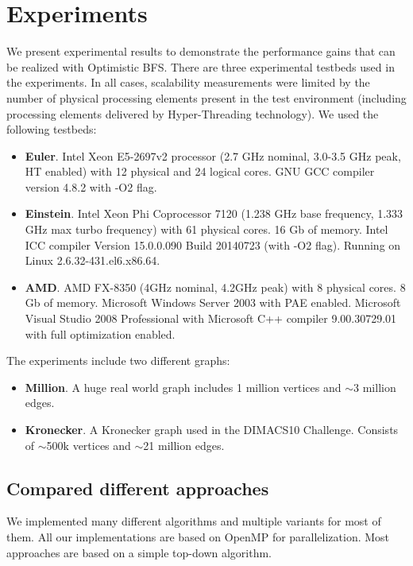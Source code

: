 \documentclass[letterpaper]{article}
\begin{document}
	\section{Experiments}\label{sec:expe} %
		We present experimental results to demonstrate the performance gains that can be realized with Optimistic BFS.
		There are three experimental testbeds used in the experiments. 
		In all cases, scalability measurements were limited by the number of physical processing elements present in the test environment (including processing elements delivered by Hyper-Threading technology).
		We used the following testbeds:
		\begin{itemize}
			\item \textbf{Euler}. Intel Xeon E5-2697v2 processor (2.7 GHz nominal, 3.0-3.5 GHz peak, HT enabled) with 12 physical and 24 logical cores. GNU GCC compiler version 4.8.2 with -O2 flag. 
			\item \textbf{Einstein}. Intel Xeon Phi Coprocessor 7120 (1.238 GHz base frequency, 1.333 GHz max turbo frequency) with 61 physical cores. 16 Gb of memory.
			Intel ICC compiler Version 15.0.0.090 Build 20140723 (with -O2 flag).
			Running on Linux 2.6.32-431.el6.x86.64.
			

			\item \textbf{AMD}. AMD FX-8350 (4GHz nominal, 4.2GHz peak) with 8 physical cores. 8 Gb of memory. Microsoft Windows Server 2003 with PAE enabled. Microsoft Visual Studio 2008 Professional with  Microsoft C++ compiler 9.00.30729.01 with full optimization enabled.
		\end{itemize}
		The experiments include two different graphs:
		\begin{itemize}
			\item \textbf{Million}. A huge real world graph includes 1 million vertices and $\sim$3 million edges.
			\item \textbf{Kronecker}. A Kronecker graph used in the DIMACS10 Challenge. Consists of $\sim$500k vertices and $\sim$21 million edges.
		\end{itemize}
		
		\subsection{Compared different approaches}\label{sec:approaches}
		
		We implemented many different algorithms and multiple variants for most of them. 			%
		All our implementations are based on OpenMP for parallelization.
		Most approaches are based on a simple top-down algorithm. 
\end{document}
